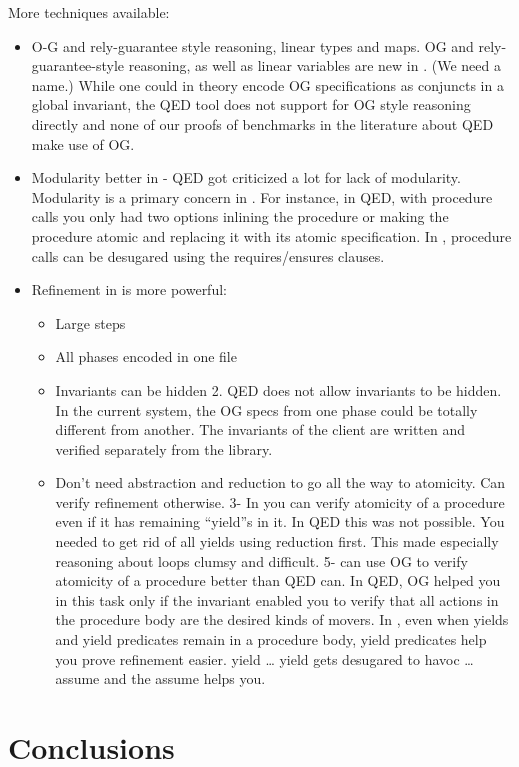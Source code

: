 More techniques available:
\begin{itemize}
  \item O-G and rely-guarantee style reasoning, linear types and maps. OG and rely-guarantee-style reasoning, as well as linear variables are new in \civl. (We need a name.)  While one could in theory encode OG specifications as conjuncts in a global invariant, the QED tool does not support for OG style reasoning directly and none of our proofs of benchmarks in the literature about QED make use of OG.
  \item Modularity better in - QED got criticized a lot for lack of modularity. Modularity is a primary concern in \civl. For instance, in QED, with procedure calls you only had two options inlining the procedure or making the procedure atomic and replacing it with its atomic specification. In \civl, procedure calls can be desugared using the requires/ensures clauses. 

  \item Refinement in \civl is more powerful:
  \begin{itemize}
    \item Large steps
    \item All phases encoded in one file
    \item Invariants can be hidden
2.       QED does not allow invariants to be hidden.  In the current system, the OG specs from one phase could be totally different from another.  The invariants of the client are written and verified separately from the library.
    \item Don't need abstraction and reduction to go all the way to atomicity. Can verify refinement otherwise.
3- In \civl you can verify atomicity of a procedure even if it has remaining “yield”s in it. In QED this was not possible. You needed to get rid of all yields using reduction first. This made especially reasoning about loops clumsy and difficult. 
5- \civl can use OG to verify atomicity of a procedure better than QED can. In QED, OG helped you in this task only if the invariant enabled you to verify that all actions in the procedure body are the desired kinds of movers.  In \civl, even when yields and yield predicates remain in a procedure body, yield predicates help you prove refinement easier. yield \phi … yield \psi gets desugared to havoc … assume \phi and the assume \phi helps you.
  \end{itemize}
\end{itemize}

\section{Conclusions}

